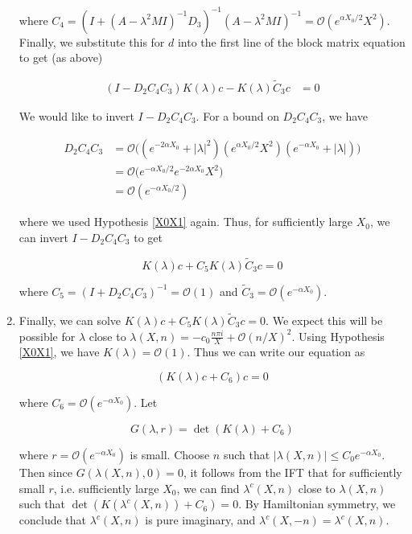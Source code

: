 \documentclass[12pt]{article}
\begin{document}
\begin{enumerate}
where $C_4 = (I + (A - \lambda^2 MI)^{-1} D_3)^{-1}(A - \lambda^2 MI)^{-1} = \mathcal{O}(e^{\alpha X_0/2} X^2)$.\\

Finally, we substitute this for $d$ into the first line of the block matrix equation to get (as above)

\begin{align*}
(I - D_2 C_4 C_3 ) K(\lambda)c - K(\lambda) \tilde{C}_3 c &= 0
\end{align*}

We would like to invert $I - D_2 C_4 C_3$. For a bound on $D_2 C_4 C_3$, we have

\begin{align*}
D_2 C_4 C_3 &= \mathcal{O}\Big( (e^{-2 \alpha X_0} + |\lambda|^2)( e^{\alpha X_0/2} X^2)(e^{-\alpha X_0} + |\lambda|) \Big) \\
&= \mathcal{O}\Big( e^{-\alpha X_0/2} e^{- 2 \alpha X_0} X^2 \Big) \\
&= \mathcal{O}( e^{-\alpha X_0/2})
\end{align*}

where we used Hypothesis \ref{X0X1} again. Thus, for sufficiently large $X_0$, we can invert $I - D_2 C_4 C_3$ to get

\[
K(\lambda)c + C_5 K(\lambda) \tilde{C}_3 c = 0
\]

where $C_5 = (I + D_2 C_4 C_3)^{-1} = \mathcal{O}(1)$ and $\tilde{C}_3 = \mathcal{O}(e^{-\alpha X_0})$.

\item Finally, we can solve $K(\lambda)c + C_5 K(\lambda) \tilde{C}_3 c = 0$. We expect this will be possible for $\lambda$ close to $\lambda(X, n) = -c_0 \frac{n \pi i }{X} + \mathcal{O}(n/X)^2$. Using Hypothesis \ref{X0X1}, we have $K(\lambda) = \mathcal{O}(1)$. Thus we can write our equation as

\[
(K(\lambda)c + C_6 ) c = 0
\]

where $C_6 = \mathcal{O}(e^{-\alpha X_0})$. Let

\[
G(\lambda, r) = \det( K(\lambda) + C_6 )
\]

where $r = \mathcal{O}(e^{-\alpha X_0})$ is small. Choose $n$ such that $|\lambda(X,n)| \leq C_0 e^{-\alpha X_0}$. Then since $G( \lambda(X, n), 0) = 0$, it follows from the IFT that for sufficiently small $r$, i.e. sufficiently large $X_0$, we can find $\lambda^c(X, n)$ close to $\lambda(X, n)$ such that $\det ( K(\lambda^c(X, n)) + C_6 ) = 0$. By Hamiltonian symmetry, we conclude that $\lambda^c(X, n)$ is pure imaginary, and $\lambda^c(X, -n) = \lambda^c(X, n)$.


\end{enumerate}
\end{document}

